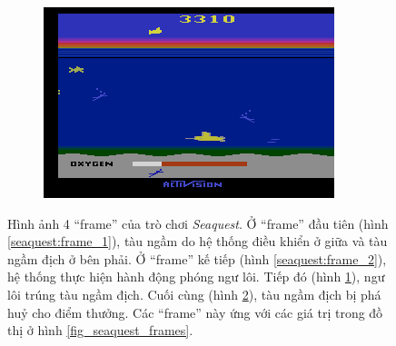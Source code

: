 \begin{figure}
\begin{subfigure}{.5\textwidth}
			\caption{}
			\label{seaquest:frame_3}
		\end{subfigure}%
		\begin{subfigure}{.5\textwidth}
			\centering
			\includegraphics[width=.8\linewidth]{008191}
			\caption{}
			\label{seaquest:frame_4}
		\end{subfigure}%
		\caption[Hình ảnh một số ``frame'' của trò chơi \textit{Seaquest}]{Hình ảnh 4 ``frame'' của trò chơi \textit{Seaquest}.
		Ở ``frame'' đầu tiên (hình \ref{seaquest:frame_1}), tàu ngầm do hệ thống điều khiển ở giữa và tàu ngầm địch ở bên phải.
		Ở ``frame'' kế tiếp (hình \ref{seaquest:frame_2}), hệ thống thực hiện hành động phóng ngư lôi.
		Tiếp đó (hình \ref{seaquest:frame_3}), ngư lôi trúng tàu ngầm địch.
		Cuối cùng (hình \ref{seaquest:frame_4}), tàu ngầm địch bị phá huỷ cho điểm thưởng.
		Các ``frame'' này ứng với các giá trị trong đồ thị ở hình \ref{fig_seaquest_frames}.}
		\label{seaquest:frames}
	\end{figure}
	
